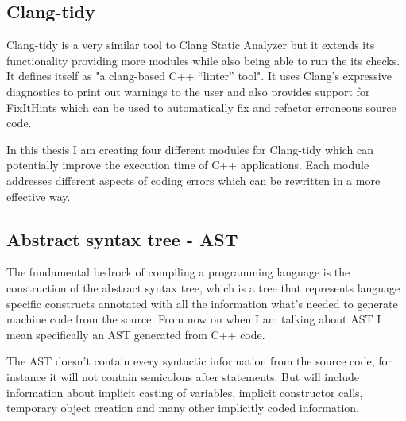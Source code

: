 \subsection{Clang-tidy}
\par Clang-tidy is a very similar tool to Clang Static Analyzer but it extends its functionality providing more modules while also being able to run the its checks. It defines itself as "a clang-based C++ “linter” tool"\cite{clang_tidy_mainpage}. It uses Clang's expressive diagnostics to print out warnings to the user and also provides support for FixItHints which can be used to automatically fix and refactor erroneous source code. \medskip
\par In this thesis I am creating four different modules for Clang-tidy which can potentially improve the execution time of C++ applications. Each module addresses different aspects of coding errors which can be rewritten in a more effective way. 
\subsection{Abstract syntax tree - AST}
\par The fundamental bedrock of compiling a programming language is the construction of the abstract syntax tree, which is a tree that represents language specific constructs annotated with all the information what's needed to generate machine code from the source. From now on when I am talking about AST I mean specifically an AST generated from C++ code. \medskip
\par The AST doesn't contain every syntactic information from the source code, for instance it will not contain semicolons after statements. But will include information about implicit casting of variables, implicit constructor calls, temporary object creation and many other implicitly coded information. 

